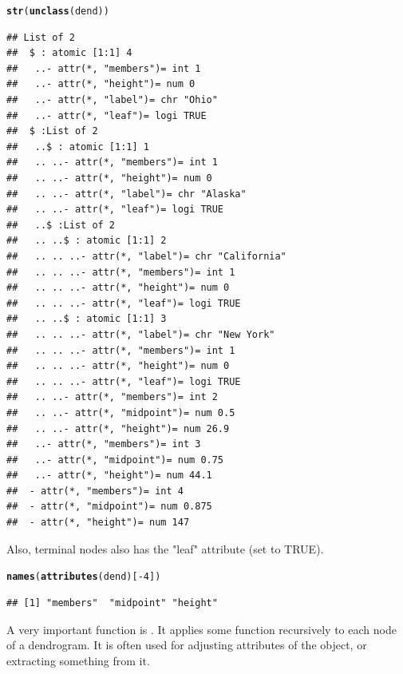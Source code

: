 \documentclass[shortnames,nojss,article]{jss}\usepackage{graphicx, color}
\makeatletter
\newcommand{\hlfunctioncall}[1]{\textcolor[rgb]{0.501960784313725,0,0.329411764705882}{\textbf{#1}}}%
\newenvironment{kframe}{%
 \def\at@end@of@kframe{}%
 \ifinner\ifhmode%
  \def\at@end@of@kframe{\end{minipage}}%
  \begin{minipage}{\columnwidth}%
 \fi\fi%
 \def\FrameCommand##1{\hskip\@totalleftmargin \hskip-\fboxsep
 \colorbox{shadecolor}{##1}\hskip-\fboxsep
     \hskip-\linewidth \hskip-\@totalleftmargin \hskip\columnwidth}%
 \MakeFramed {\advance\hsize-\width
   \@totalleftmargin\z@ \linewidth\hsize
   \@setminipage}}%
 {\par\unskip\endMakeFramed%
 \at@end@of@kframe}
\newenvironment{knitrout}{}{} %
\makeatother
\begin{document}
\begin{knitrout}
\color{fgcolor}\begin{kframe}
\begin{alltt}
\hlfunctioncall{str}(\hlfunctioncall{unclass}(dend))
\end{alltt}
\begin{verbatim}
## List of 2
##  $ : atomic [1:1] 4
##   ..- attr(*, "members")= int 1
##   ..- attr(*, "height")= num 0
##   ..- attr(*, "label")= chr "Ohio"
##   ..- attr(*, "leaf")= logi TRUE
##  $ :List of 2
##   ..$ : atomic [1:1] 1
##   .. ..- attr(*, "members")= int 1
##   .. ..- attr(*, "height")= num 0
##   .. ..- attr(*, "label")= chr "Alaska"
##   .. ..- attr(*, "leaf")= logi TRUE
##   ..$ :List of 2
##   .. ..$ : atomic [1:1] 2
##   .. .. ..- attr(*, "label")= chr "California"
##   .. .. ..- attr(*, "members")= int 1
##   .. .. ..- attr(*, "height")= num 0
##   .. .. ..- attr(*, "leaf")= logi TRUE
##   .. ..$ : atomic [1:1] 3
##   .. .. ..- attr(*, "label")= chr "New York"
##   .. .. ..- attr(*, "members")= int 1
##   .. .. ..- attr(*, "height")= num 0
##   .. .. ..- attr(*, "leaf")= logi TRUE
##   .. ..- attr(*, "members")= int 2
##   .. ..- attr(*, "midpoint")= num 0.5
##   .. ..- attr(*, "height")= num 26.9
##   ..- attr(*, "members")= int 3
##   ..- attr(*, "midpoint")= num 0.75
##   ..- attr(*, "height")= num 44.1
##  - attr(*, "members")= int 4
##  - attr(*, "midpoint")= num 0.875
##  - attr(*, "height")= num 147
\end{verbatim}
\end{kframe}
\end{knitrout}



Also, terminal nodes also has the "leaf" attribute (set to TRUE).
\begin{knitrout}
\color{fgcolor}\begin{kframe}
\begin{alltt}
\hlfunctioncall{names}(\hlfunctioncall{attributes}(dend)[-4])
\end{alltt}
\begin{verbatim}
## [1] "members"  "midpoint" "height"
\end{verbatim}
\end{kframe}
\end{knitrout}




A very important function is . It applies some function recursively to each node of a dendrogram. It is often used for adjusting attributes of the object, or extracting something from it. 
\end{document}
